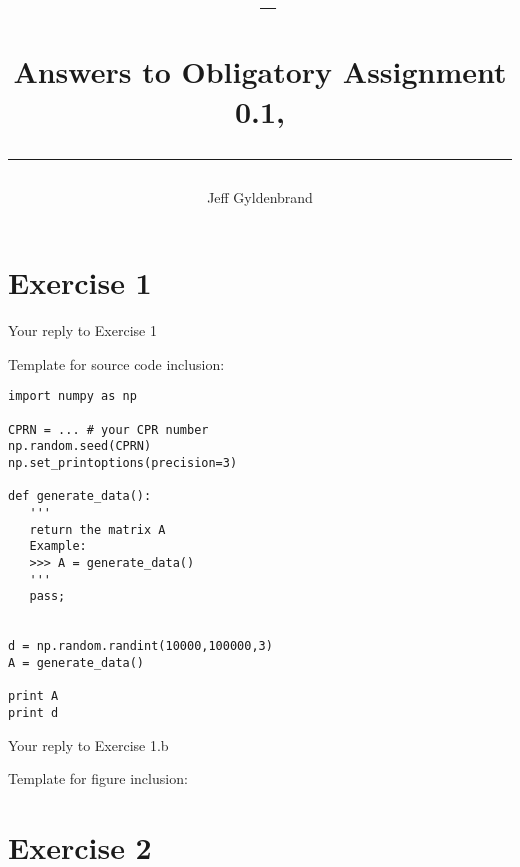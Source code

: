 \documentclass[a4paper,10pt]{article}
\author{Jeff Gyldenbrand}
\title{\begin{flushleft}
\vspace{-4ex}
\courseid~-- \coursename \\[0.2cm]
{\Large Answers to Obligatory Assignment 0.1, \term \\[3ex]
\hrule}
\end{flushleft}
}
\date{}
\begin{document}
\maketitle

\section*{Exercise 1}



Your reply to Exercise 1


Template for source code inclusion:

\begin{lstlisting}
import numpy as np

CPRN = ... # your CPR number
np.random.seed(CPRN)
np.set_printoptions(precision=3)

def generate_data():
   '''
   return the matrix A
   Example:
   >>> A = generate_data()
   '''
   pass;


d = np.random.randint(10000,100000,3)
A = generate_data() 

print A
print d
\end{lstlisting}


Your reply to Exercise 1.b


Template for figure inclusion:

\begin{figure}[htb]
\begin{center}
\end{center}
\end{figure}

\newpage
\section*{Exercise 2}
\end{document}

